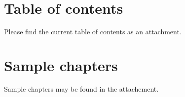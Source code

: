 \documentclass[10pt, article, one side]{memoir}
\begin{document}
    \chapter{Table of contents}
    Please find the current table of contents as an attachment.

    \chapter{Sample chapters}
    Sample chapters may be found in the attachement.

    
    

\end{document}
